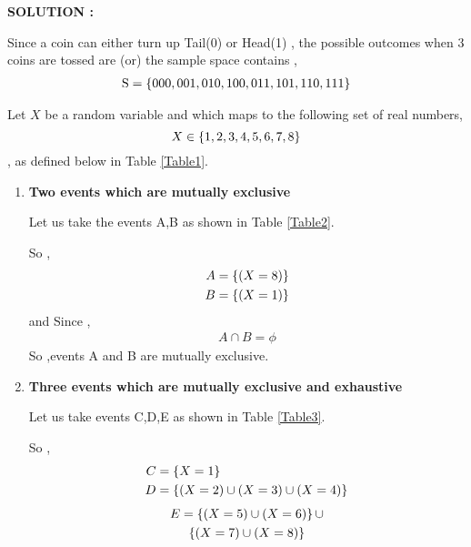 \documentclass[journal,12pt,twocolumn]{IEEEtran}
\begin{document}
\textbf{SOLUTION :}

Since a coin can either turn up Tail(0) or Head(1) , the possible outcomes when 3 coins are tossed are (or) the sample space contains ,
\begin{align}
	\text{S} = \left\{000,001,010,100,011,101,110,111\right\}
\end{align}

Let $X$ be a random variable and which maps to the following set of real numbers,
$$X \in \left\{1,2,3,4,5,6,7,8\right\}$$ ,
as defined below in Table \ref{Table1}.

\begin{table}[ht!]
    
    \caption{}
    \label{Table1}
\end{table}

\begin{enumerate}[label=(\roman*)]
    \item 
    \textbf{Two events which are mutually exclusive} 
    
    Let us take the events A,B as shown in Table \ref{Table2}.
    \begin{table}[ht!]
        
        \caption{}
        \label{Table2}
    \end{table}
    So ,
    \begin{align}
        A &= \left\{ (X=8) \right\}\\
        B &= \left\{ (X=1) \right\}
    \end{align}
    and Since ,
    \begin{align}
        A \cap B = \phi
    \end{align}
    So ,events A and B are mutually exclusive.
  
    \item \textbf{Three events which are mutually exclusive and exhaustive}
    
    Let us take events C,D,E as shown in Table \ref{Table3}.
    \begin{table}[ht!]
        
        \caption{}
        \label{Table3}
    \end{table}
    So ,
    \begin{align}
        C &= \left\{ X=1\right\}  \\
        D &= \left\{ (X=2) \cup (X=3) \cup (X=4) \right\}
    \end{align}
    \begin{multline}
	    E =  \left\{(X=5) \cup (X=6)\right\} \cup \\
	         \left\{(X=7) \cup (X=8)\right\}
    \end{multline}
    

\end{enumerate}
\end{document}
